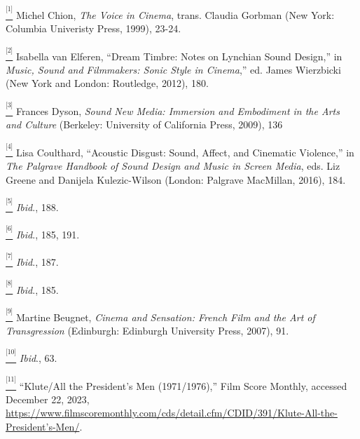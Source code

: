 \href{applewebdata://3A1D666A-D52A-46D2-8C90-343A1EE58F85\#_ftnref1}{\textsuperscript{\textsuperscript{[1]}}} Michel Chion, \textit{The Voice in Cinema}, trans. Claudia Gorbman (New York: Columbia Univeristy Press, 1999), 23-24.

\href{applewebdata://3A1D666A-D52A-46D2-8C90-343A1EE58F85\#_ftnref2}{\textsuperscript{\textsuperscript{[2]}}} Isabella van Elferen, “Dream Timbre: Notes on Lynchian Sound Design,” in \textit{Music, Sound and Filmmakers: Sonic Style in Cinema},” ed. James Wierzbicki (New York and London: Routledge, 2012), 180.

\href{applewebdata://3A1D666A-D52A-46D2-8C90-343A1EE58F85\#_ftnref3}{\textsuperscript{\textsuperscript{[3]}}} Frances Dyson, \textit{Sound New Media: Immersion and Embodiment in the Arts and Culture} (Berkeley: University of California Press, 2009), 136

\href{applewebdata://3A1D666A-D52A-46D2-8C90-343A1EE58F85\#_ftnref4}{\textsuperscript{\textsuperscript{[4]}}} Lisa Coulthard, “Acoustic Disgust: Sound, Affect, and Cinematic Violence,” in \textit{The Palgrave Handbook of Sound Design and Music in Screen Media}, eds. Liz Greene and Danijela Kulezic-Wilson (London: Palgrave MacMillan, 2016), 184.

\href{applewebdata://3A1D666A-D52A-46D2-8C90-343A1EE58F85\#_ftnref5}{\textsuperscript{\textsuperscript{[5]}}} \textit{Ibid}., 188.

\href{applewebdata://3A1D666A-D52A-46D2-8C90-343A1EE58F85\#_ftnref6}{\textsuperscript{\textsuperscript{[6]}}} \textit{Ibid}., 185, 191.

\href{applewebdata://3A1D666A-D52A-46D2-8C90-343A1EE58F85\#_ftnref7}{\textsuperscript{\textsuperscript{[7]}}} \textit{Ibid}., 187.

\href{applewebdata://3A1D666A-D52A-46D2-8C90-343A1EE58F85\#_ftnref8}{\textsuperscript{\textsuperscript{[8]}}} \textit{Ibid}., 185.

\href{applewebdata://3A1D666A-D52A-46D2-8C90-343A1EE58F85\#_ftnref9}{\textsuperscript{\textsuperscript{[9]}}} Martine Beugnet, \textit{Cinema and Sensation: French Film and the Art of Transgression }(Edinburgh: Edinburgh University Press, 2007), 91.

\href{applewebdata://3A1D666A-D52A-46D2-8C90-343A1EE58F85\#_ftnref10}{\textsuperscript{\textsuperscript{[10]}}} \textit{Ibid}., 63.

\href{applewebdata://3A1D666A-D52A-46D2-8C90-343A1EE58F85\#_ftnref11}{\textsuperscript{\textsuperscript{[11]}}} “Klute/All the President’s Men (1971/1976),” Film Score Monthly, accessed December 22, 2023, \href{https://www.filmscoremonthly.com/cds/detail.cfm/CDID/391/Klute-All-the-President\%E2\%80\%99s-Men/}{https://www.filmscoremonthly.com/cds/detail.cfm/CDID/391/Klute-All-the-President’s-Men/}. 

